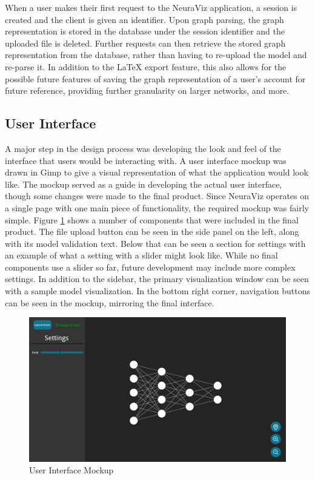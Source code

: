 When a user makes their first request to the NeuraViz application, a session is created and the client is given an identifier. Upon graph parsing, the graph representation is stored in the database under the session identifier and the uploaded file is deleted. Further requests can then retrieve the stored graph representation from the database, rather than having to re-upload the model and re-parse it. In addition to the LaTeX export feature, this also allows for the possible future features of saving the graph representation of a user's account for future reference, providing further granularity on larger networks, and more.

\subsection{User Interface}
A major step in the design process was developing the look and feel of the interface that users would be interacting with. A user interface mockup was drawn in Gimp to give a visual representation of what the application would look like. The mockup served as a guide in developing the actual user interface, though some changes were made to the final product. Since NeuraViz operates on a single page with one main piece of functionality, the required mockup was fairly simple. Figure \ref{fig:ui_mockup} shows a number of components that were included in the final product. The file upload button can be seen in the side panel on the left, along with its model validation text. Below that can be seen a section for settings with an example of what a setting with a slider might look like. While no final components use a slider so far, future development may include more complex settings. In addition to the sidebar, the primary visualization window can be seen with a sample model visualization. In the bottom right corner, navigation buttons can be seen in the mockup, mirroring the final interface.

\begin{figure}[ht]
    \centering
    \includegraphics[width=1\textwidth]{../docs/mockups/Main.png}
    \caption{User Interface Mockup}
    \label{fig:ui_mockup}
\end{figure}

